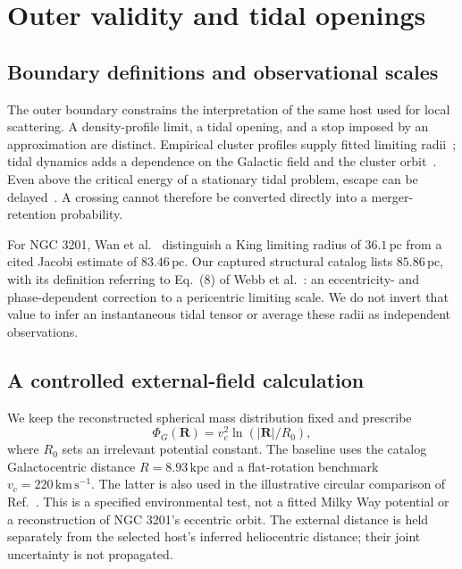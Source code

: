 \documentclass[aps,prd,reprint,amsmath,amssymb,superscriptaddress,nofootinbib,longbibliography,floatfix]{revtex4-2}
\begin{document}
\section{Outer validity and tidal openings}\label{sec:outer-boundary}

\subsection{Boundary definitions and observational scales}

The outer boundary constrains the interpretation of the same host used for local scattering. A density-profile limit, a tidal opening, and a stop imposed by an approximation are distinct. Empirical cluster profiles supply fitted limiting radii~\cite{King1962}; tidal dynamics adds a dependence on the Galactic field and the cluster orbit~\cite{Renaud2011}. Even above the critical energy of a stationary tidal problem, escape can be delayed~\cite{Fukushige2000}. A crossing cannot therefore be converted directly into a merger-retention probability.

For NGC 3201, Wan et al.~\cite{Wan2021} distinguish a King limiting radius of $36.1\,\mathrm{pc}$ from a cited Jacobi estimate of $83.46\,\mathrm{pc}$. Our captured structural catalog lists $85.86\,\mathrm{pc}$, with its definition referring to Eq.~(8) of Webb et al.~\cite{Webb2013}: an eccentricity- and phase-dependent correction to a pericentric limiting scale. We do not invert that value to infer an instantaneous tidal tensor or average these radii as independent observations.

\subsection{A controlled external-field calculation}

We keep the reconstructed spherical mass distribution fixed and prescribe
\begin{equation}
\Phi_G(\mathbf R)=v_c^2\ln(|\mathbf R|/R_0),
\label{eq:log-galaxy}
\end{equation}
where $R_0$ sets an irrelevant potential constant. The baseline uses the catalog Galactocentric distance $R=8.93\,\mathrm{kpc}$ and a flat-rotation benchmark $v_c=220\,\mathrm{km\,s^{-1}}$. The latter is also used in the illustrative circular comparison of Ref.~\cite{Wan2021}. This is a specified environmental test, not a fitted Milky Way potential or a reconstruction of NGC 3201's eccentric orbit. The external distance is held separately from the selected host's inferred heliocentric distance; their joint uncertainty is not propagated.
\end{document}
